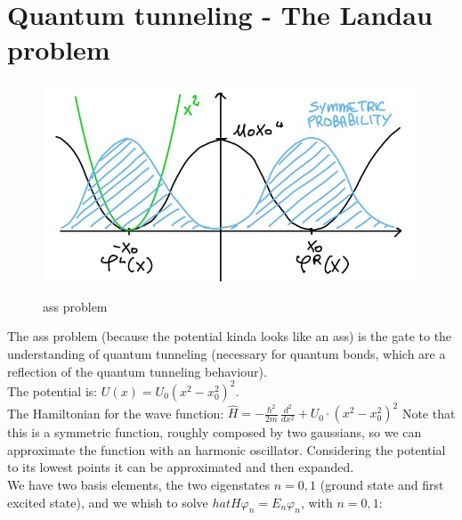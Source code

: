 \section{Quantum tunneling - The Landau problem}
\begin{figure}[htbp!]
	\centering
	\includegraphics[scale=0.30]{img_2.jpg}
	\label{fig:ass}
	\caption{ass problem}
\end{figure}
The ass problem (because the potential kinda looks like an ass) is the gate to the understanding of quantum tunneling (necessary for quantum bonds, which are a reflection of the quantum tunneling behaviour). \\
The potential is: $U(x)=U_0(x^2-x_0^2)^2$.\\

The Hamiltonian for the wave function: $\hat{H}=-\frac{\hbar^2}{2m}\,\frac{d^2}{dx^2}+U_0\cdot(x^2-x_0^2)^2$
Note that this is a symmetric function, roughly composed by two gaussians, so we can approximate the function with an harmonic oscillator. Considering the potential to its lowest points it can be approximated and then expanded. \\

We have two basis elements, the two eigenstates $n=0,1$ (ground state and first excited state), and we whish to solve $hat{H}\varphi_n=E_n\varphi_n$, with $n=0,1$:

